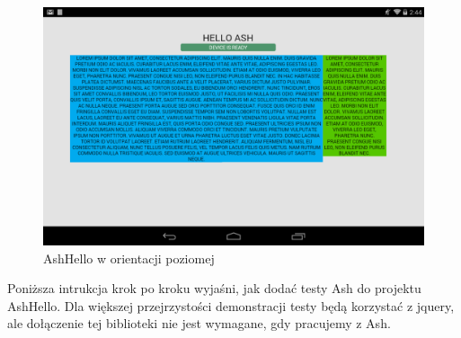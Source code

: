 \documentclass[brudnopis]{xmgr}
\begin{document}
\begin{itemize}
\begin{figure}[p]
    \centering
    \includegraphics[scale=0.25]{hello2.png}
    \caption{AshHello w orientacji poziomej}
    \label{fig:AshHello2}
\end{figure}
\end{itemize}

Poniższa intrukcja krok po kroku wyjaśni, jak dodać testy Ash do projektu AshHello. Dla większej przejrzystości demonstracji testy będą korzystać z jquery, ale dołączenie tej biblioteki nie jest wymagane, gdy pracujemy z Ash.  
\end{document}
